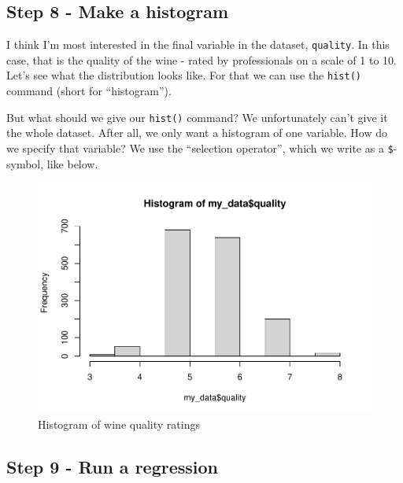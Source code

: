 \documentclass[
]{book}
\newenvironment{Shaded}{\begin{snugshade}}{\end{snugshade}}
\newcommand{\FunctionTok}[1]{\textcolor[rgb]{0.00,0.00,0.00}{#1}}
\newcommand{\NormalTok}[1]{#1}
\newcommand{\SpecialCharTok}[1]{\textcolor[rgb]{0.00,0.00,0.00}{#1}}
\begin{document}
\hypertarget{step-8---make-a-histogram}{%
\subsection{Step 8 - Make a histogram}\label{step-8---make-a-histogram}}

I think I'm most interested in the final variable in the dataset, \texttt{quality}. In this case, that is the quality of the wine - rated by professionals on a scale of 1 to 10. Let's see what the distribution looks like. For that we can use the \texttt{hist()} command (short for ``histogram'').

But what should we give our \texttt{hist()} command? We unfortunately can't give it the whole dataset. After all, we only want a histogram of one variable. How do we specify that variable? We use the ``selection operator'', which we write as a \texttt{\$}-symbol, like below.

\begin{Shaded}
\end{Shaded}

\begin{figure}

{\centering \includegraphics[width=0.8\linewidth]{_main_files/figure-latex/unnamed-chunk-12-1} 

}

\caption{Histogram of wine quality ratings}\label{fig:unnamed-chunk-12}
\end{figure}

\hypertarget{step-9---run-a-regression}{%
\subsection{Step 9 - Run a regression}\label{step-9---run-a-regression}}
\end{document}
